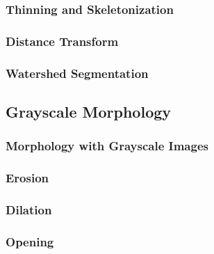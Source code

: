 \subsubsection{Thinning and Skeletonization} 
\label{booksection_91_Thinning_and_Skeletonization}

\subsubsection{Distance Transform} 
\label{booksection_92_Distance_Transform}

\subsubsection{Watershed Segmentation} 
\label{booksection_93_Watershed_Segmentation}

\subsection{Grayscale Morphology} 
\label{booksection_94_Grayscale_Morphology}
\subsubsection{Morphology with Grayscale Images} 
\label{booksection_95_Morphology_with_Grayscale_Images}

\subsubsection{Erosion} 
\label{booksection_96_Erosion}

\subsubsection{Dilation} 
\label{booksection_97_Dilation}

\subsubsection{Opening} 
\label{booksection_98_Opening}

